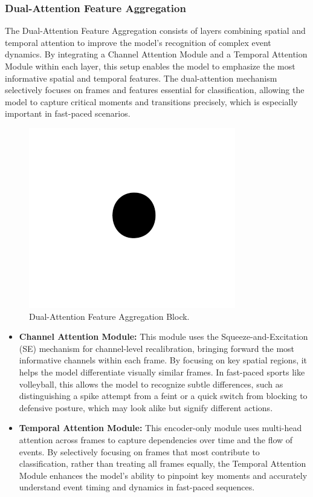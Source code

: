 \documentclass[conference]{IEEEtran}
\begin{document}
\subsubsection{Dual-Attention Feature Aggregation}
The Dual-Attention Feature Aggregation consists of layers combining spatial and temporal attention to improve the model’s recognition of complex event dynamics. By integrating a Channel Attention Module and a Temporal Attention Module within each layer, this setup enables the model to emphasize the most informative spatial and temporal features. The dual-attention mechanism selectively focuses on frames and features essential for classification, allowing the model to capture critical moments and transitions precisely, which is especially important in fast-paced scenarios.

\begin{figure}[htbp]
    \centerline{\includegraphics{fig1.png}}
    \caption{Dual-Attention Feature Aggregation Block.}
    \label{fig2}
\end{figure}

\begin{itemize}
    \item \textbf{Channel Attention Module:} This module uses the Squeeze-and-Excitation (SE) mechanism \cite{8578843} for channel-level recalibration, bringing forward the most informative channels within each frame. By focusing on key spatial regions, it helps the model differentiate visually similar frames. In fast-paced sports like volleyball, this allows the model to recognize subtle differences, such as distinguishing a spike attempt from a feint or a quick switch from blocking to defensive posture, which may look alike but signify different actions.

    \item \textbf{Temporal Attention Module:} This encoder-only module uses multi-head attention \cite{10.5555/3295222.3295349} across frames to capture dependencies over time and the flow of events. By selectively focusing on frames that most contribute to classification, rather than treating all frames equally, the Temporal Attention Module enhances the model’s ability to pinpoint key moments and accurately understand event timing and dynamics in fast-paced sequences.
\end{itemize}
\end{document}
